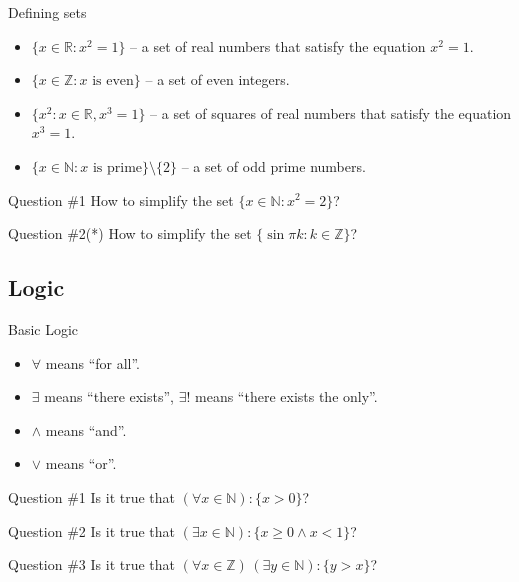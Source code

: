 \documentclass{beamer}
\begin{document}
    \begin{frame}{Defining sets}
      \begin{example}
        \begin{itemize}
          \item $\{x \in \mathbb{R}: x^2 = 1\}$ -- a set of real numbers that satisfy the equation $x^2 = 1$.
          \item $\{x \in \mathbb{Z}: x \text{ is even}\}$ -- a set of even integers.
          \item $\{x^2: x \in \mathbb{R}, x^3 = 1\}$ -- a set of squares of real numbers that satisfy the equation $x^3 = 1$.
          \item $\{x \in \mathbb{N}: x \text{ is prime}\} \setminus \{2\}$ -- a set of odd prime numbers.
        \end{itemize}
      \end{example}

      \begin{alertblock}{Question \#1}
        How to simplify the set $\{x \in \mathbb{N}: x^2 = 2\}$?
      \end{alertblock}
  
      \begin{alertblock}{Question \#2(*)}
        How to simplify the set $\{\sin \pi k: k \in \mathbb{Z}\}$?
      \end{alertblock}
    \end{frame}

    \subsection{Logic}
    \begin{frame}{Basic Logic}
        \begin{itemize}
          \item $\forall$ means ``for all''.
          \item $\exists$ means ``there exists'', $\exists!$ means ``there exists the only''.
          \item $\land$ means ``and''.
          \item $\lor$ means ``or''.
        \end{itemize}

        \begin{alertblock}{Question \#1}
            Is it true that $(\forall x \in \mathbb{N}): \{x > 0\}$?
        \end{alertblock}

        \begin{alertblock}{Question \#2}
            Is it true that $(\exists x \in \mathbb{N}): \{x \geq 0 \land x < 1\}$?
        \end{alertblock}

        \begin{alertblock}{Question \#3}
            Is it true that $(\forall x \in \mathbb{Z})\, (\exists y \in \mathbb{N}): \{y > x\}$?
        \end{alertblock}
    \end{frame}
\end{document}

